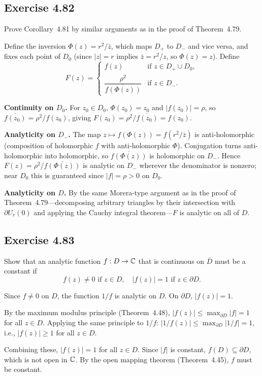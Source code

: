 \documentclass{article}
\begin{document}
\subsection{Exercise 4.82}

Prove Corollary~4.81 by similar arguments as in the proof of
Theorem~4.79.

\begin{solution}
  Define the inversion $\Phi(z) = r^2/\bar{z}$, which maps $D_+$ to
  $D_-$ and vice versa, and fixes each point of $D_0$ (since
  $|z| = r$ implies $\bar{z} = r^2/z$, so $\Phi(z) = z$).  Define
  \[
    F(z) =
    \begin{cases}
      f(z) & \text{if } z \in D_+ \cup D_0, \\[4pt]
      \dfrac{\rho^2}{\overline{f(\Phi(z))}} & \text{if } z \in D_-.
    \end{cases}
  \]

  \textbf{Continuity on $D_0$.}
  For $z_0 \in D_0$, $\Phi(z_0) = z_0$ and $|f(z_0)| = \rho$, so
  $\overline{f(z_0)} = \rho^2/f(z_0)$, giving
  $F(z_0) = \rho^2/\overline{f(z_0)} = f(z_0)$.

  \textbf{Analyticity on $D_-$.}
  The map $z \mapsto f(\Phi(z)) = f(r^2/\bar{z})$ is anti-holomorphic
  (composition of holomorphic $f$ with anti-holomorphic $\Phi$).
  Conjugation turns anti-holomorphic into holomorphic, so
  $\overline{f(\Phi(z))}$ is holomorphic on $D_-$.
  Hence $F(z) = \rho^2/\overline{f(\Phi(z))}$ is analytic on $D_-$
  wherever the denominator is nonzero; near $D_0$ this is guaranteed
  since $|f| = \rho > 0$ on $D_0$.

  \textbf{Analyticity on $D$.}
  By the same Morera-type argument as in the proof of
  Theorem~4.79---decomposing arbitrary triangles by their intersection
  with $\partial U_r(0)$ and applying the Cauchy integral
  theorem---$F$ is analytic on all of $D$.
\end{solution}

\subsection{Exercise 4.83}

Show that an analytic function $f : D \to \mathbb{C}$ that is continuous on
$\overline{D}$ must be a constant if
\[
  f(z) \ne 0 \text{ if } z \in D, \quad
  |f(z)| = 1 \text{ if } z \in \partial D.
\]

\begin{solution}
  Since $f \ne 0$ on $D$, the function $1/f$ is analytic on $D$.
  On $\partial D$, $|f(z)| = 1$.

  By the maximum modulus principle (Theorem~4.48),
  $|f(z)| \le \max_{\partial D}|f| = 1$ for all $z \in D$.
  Applying the same principle to $1/f$:
  $|1/f(z)| \le \max_{\partial D}|1/f| = 1$, i.e.,
  $|f(z)| \ge 1$ for all $z \in D$.

  Combining these, $|f(z)| = 1$ for all $z \in D$.
  Since $|f|$ is constant, $f(D) \subseteq \partial D$, which is not
  open in $\mathbb{C}$. By the open mapping theorem (Theorem~4.45), $f$ must
  be constant.
\end{solution}
\end{document}
